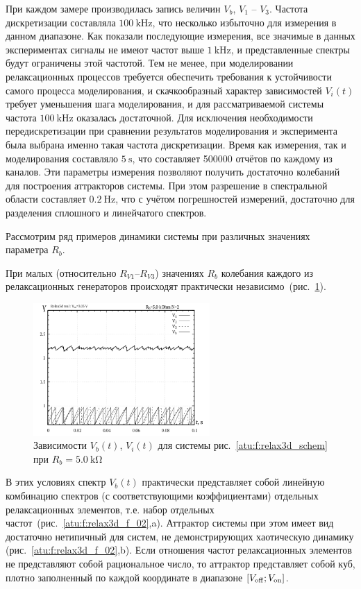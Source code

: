 При каждом замере
производилась запись величин
$V_b$, $V_1$ -- $V_3$.
Частота дискретизации составляла $\SI{100}{\kilo\hertz}$,
что несколько избыточно для измерения в данном диапазоне.
Как показали последующие измерения,
все значимые в данных экспериментах сигналы не имеют
частот выше $\SI{1}{\kilo\hertz}$,
и представленные спектры будут ограничены этой частотой.
Тем не менее, при моделировании релаксационных
процессов требуется обеспечить требования к устойчивости
самого процесса моделирования, и скачкообразный
характер зависимостей $V_i(t)$
требует уменьшения шага моделирования, и для
рассматриваемой системы частота
$\SI{100}{\kilo\hertz}$ оказалась достаточной.
Для исключения необходимости передискретизации
при сравнении результатов моделирования
и эксперимента была выбрана именно такая частота дискретизации.
Время как измерения, так и моделирования составляло
$\SI{5}{\s}$, что составляет 500000 отчётов
по каждому из каналов.
Эти параметры измерения позволяют получить достаточно
колебаний для построения аттракторов системы.
При этом разрешение в спектральной области
составляет
$\SI{0.2}{\hertz}$, что с учётом погрешностей измерений,
достаточно для разделения сплошного и линейчатого спектров.

Рассмотрим ряд примеров динамики системы
при различных значениях параметра $R_b$.

При малых (относительно $R_{V1}$--$R_{V3}$)
значениях $R_b$
колебания каждого из релаксационных генераторов
происходят практически независимо~(рис.~\ref{atu:f:relax3d_t_02}).

\begin{figure}[htb!]
  \centerline{\includegraphics[width=0.6\textwidth]{p/relax3d_t_02.png} }
  \caption{Зависимости $V_b(t)$, $V_i(t)$ для системы рис.~\ref{atu:f:relax3d_schem} при $R_b=\SI{5.0}{\kilo\ohm}$ }
  \label{atu:f:relax3d_t_02}
\end{figure}

В этих условиях спектр $V_b(t)$ практически представляет собой линейную комбинацию спектров
(с соответствующими коэффициентами) отдельных релаксационных
элементов, т.е. набор отдельных частот~(рис.~\ref{atu:f:relax3d_f_02},a).
Аттрактор системы при этом имеет вид достаточно нетипичный для
систем, не демонстрирующих хаотическую динамику (рис.~\ref{atu:f:relax3d_f_02},b).
Если отношения частот релаксационных элементов
не представляют собой рациональное число, то аттрактор
представляет собой куб, плотно заполненный по каждой координате в
диапазоне $[ V_\mathrm{off} ; V_\mathrm{on} ] $.



